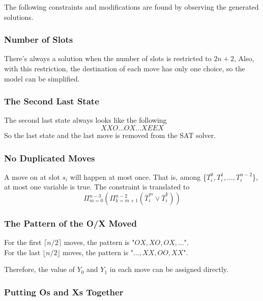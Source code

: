 \documentclass{article}
\begin{document}
    The following constraints and modifications 
    are found by observing the generated solutions.

        \subsubsection{Number of Slots}

        There's always a solution
        when the number of slots is restricted to $2n+2$, 
        Also, with this restriction, the destination of each move has only one choice, 
        so the model can be simplified. 

        \subsubsection{The Second Last State}

        The second last state always looks like the following
        $$XXO\dots OX\dots XEEX$$
        So the last state and the last move is removed from the SAT solver.

        \subsubsection{No Duplicated Moves}

        A move on at slot $s_i$ will happen at most once. 
        That is, among \{$T_i^0, T_i^1, \dots, T_i^{n-2}$\}, at most one variable is true.
        The constraint is translated to
        $$
        \Pi_{m=0}^{n-3}
        ( \Pi_{k=m+1}^{n-2} ( \overline T_i^m \lor \overline T_i^k ) )
        $$

        \subsubsection{The Pattern of the O/X Moved}

        For the first $\lceil n/2\rceil$ moves, the pattern is "$OX, XO, OX,\dots$".\\
        For the last $\lfloor n/2\rfloor$ moves, the pattern is "$\dots, XX, OO, XX$".

        Therefore, the value of $Y_0$ and $Y_1$ in each move can be assigned directly.
            
        \subsubsection{Putting Os and Xs Together}
\end{document}

